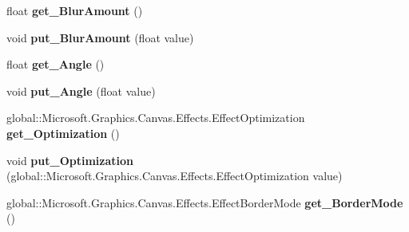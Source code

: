 \begin{DoxyCompactItemize}
float {\bfseries get\+\_\+\+Blur\+Amount} ()
\item 
\mbox{\label{class_microsoft_1_1_graphics_1_1_canvas_1_1_effects_1_1_directional_blur_effect_af6383dc92843270529d3fe1da82d3f22}} 
void {\bfseries put\+\_\+\+Blur\+Amount} (float value)
\item 
\mbox{\label{class_microsoft_1_1_graphics_1_1_canvas_1_1_effects_1_1_directional_blur_effect_a8bdc7eff811b34db9a82120142b52a62}} 
float {\bfseries get\+\_\+\+Angle} ()
\item 
\mbox{\label{class_microsoft_1_1_graphics_1_1_canvas_1_1_effects_1_1_directional_blur_effect_a271e08d62a710392a1eb0425cf803992}} 
void {\bfseries put\+\_\+\+Angle} (float value)
\item 
\mbox{\label{class_microsoft_1_1_graphics_1_1_canvas_1_1_effects_1_1_directional_blur_effect_a34a41131fdf14b40d3d67a9a36936eb3}} 
global\+::\+Microsoft.\+Graphics.\+Canvas.\+Effects.\+Effect\+Optimization {\bfseries get\+\_\+\+Optimization} ()
\item 
\mbox{\label{class_microsoft_1_1_graphics_1_1_canvas_1_1_effects_1_1_directional_blur_effect_a497e67c7243081593b64fe7d0947243a}} 
void {\bfseries put\+\_\+\+Optimization} (global\+::\+Microsoft.\+Graphics.\+Canvas.\+Effects.\+Effect\+Optimization value)
\item 
\mbox{\label{class_microsoft_1_1_graphics_1_1_canvas_1_1_effects_1_1_directional_blur_effect_a8e1e8704473064ff603694cb02c0c78f}} 
global\+::\+Microsoft.\+Graphics.\+Canvas.\+Effects.\+Effect\+Border\+Mode {\bfseries get\+\_\+\+Border\+Mode} ()
\item 
\mbox{\label{class_microsoft_1_1_graphics_1_1_canvas_1_1_effects_1_1_directional_blur_effect_acdd57b5d08067ae3121bdbefa68e50b8}} 

\end{DoxyCompactItemize}
